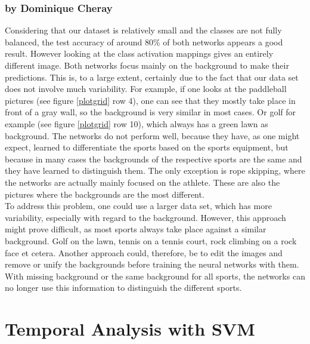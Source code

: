 \documentclass[11pt]{report}
\begin{document}
\subsubsection{by Dominique Cheray}
Considering that our dataset is relatively small and the classes are not fully
balanced, the test accuracy of around 80\% of both networks appears a good
result. However looking at the class activation mappings gives an entirely
different image. Both networks focus mainly on the background to make their
predictions. This is, to a large extent, certainly due to the fact that our
data set does not involve much variability. For example, if one looks at the
paddleball pictures (see figure \ref{plotgrid} row 4), one can see that they
mostly take place in front of a gray wall, so the background is very similar in
most cases. Or golf for example (see figure \ref{plotgrid} row 10), which always
has a green lawn as background. The networks do not perform well, because they
have, as one might expect, learned to differentiate the sports based on the
sports equipment, but because in many cases the backgrounds of the respective
sports are the same and they have learned to distinguish them.
The only exception is rope skipping, where the networks are actually mainly
focused on the athlete. These are also the pictures where the backgrounds are
the most different. \\
To address this problem, one could use a larger data set, which has more
variability, especially with regard to the background. However, this approach might prove
difficult, as most sports always take place against a similar background. Golf
on the lawn, tennis on a tennis court, rock climbing on a rock face et cetera.
Another approach could, therefore, be to edit the images and remove or unify the
backgrounds before training the neural networks with them. With missing
background or the same background for all sports, the networks can no longer use
this information to distinguish the different sports.

\section{Temporal Analysis with SVM}
\end{document}
